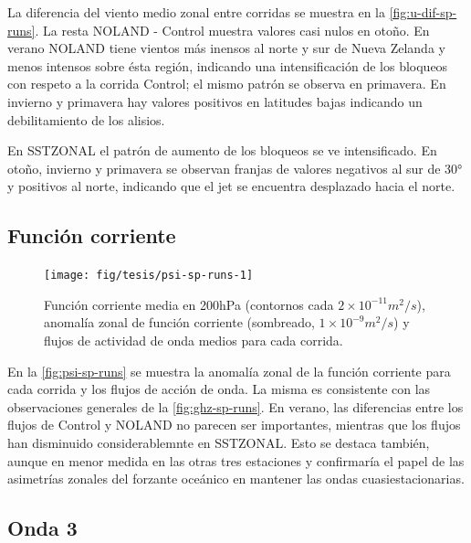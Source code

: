 \documentclass[spanish,a4paper,12pt,oneside]{book}
\begin{document}
La diferencia del viento medio zonal entre corridas se muestra en la
\autoref{fig:u-dif-sp-runs}. La resta NOLAND - Control muestra valores
casi nulos en otoño. En verano NOLAND tiene vientos más inensos al norte
y sur de Nueva Zelanda y menos intensos sobre ésta región, indicando una
intensificación de los bloqueos con respeto a la corrida Control; el
mismo patrón se observa en primavera. En invierno y primavera hay
valores positivos en latitudes bajas indicando un debilitamiento de los
alisios.

En SSTZONAL el patrón de aumento de los bloqueos se ve intensificado. En
otoño, invierno y primavera se observan franjas de valores negativos al
sur de 30° y positivos al norte, indicando que el jet se encuentra
desplazado hacia el norte.

\subsection{Función corriente}\label{funcion-corriente-3}

\begin{landscape}\begin{figure}

{\centering \texttt{[image: fig/tesis/psi-sp-runs-1]} 

}

\caption{Función corriente media en 200hPa (contornos cada $2\times10^{-11}m^2/s$), anomalía zonal de función corriente (sombreado,  $1\times10^{-9}m^2/s$) y flujos de actividad de onda medios para cada corrida.}\label{fig:psi-sp-runs}
\end{figure}
\end{landscape}

En la \autoref{fig:psi-sp-runs} se muestra la anomalía zonal de la
función corriente para cada corrida y los flujos de acción de onda. La
misma es consistente con las observaciones generales de la
\autoref{fig:ghz-sp-runs}. En verano, las diferencias entre los flujos
de Control y NOLAND no parecen ser importantes, mientras que los flujos
han disminuido considerablemnte en SSTZONAL. Esto se destaca también,
aunque en menor medida en las otras tres estaciones y confirmaría el
papel de las asimetrías zonales del forzante oceánico en mantener las
ondas cuasiestacionarias.

\subsection{Onda 3}\label{onda-3-2}
\end{document}
